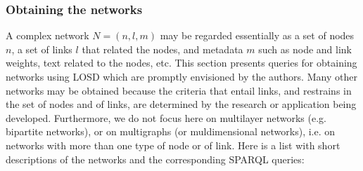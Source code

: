 \documentclass[data,datadescriptor,submit,moreauthors,pdftex]{Definitions/mdpi}
\begin{document}
\subsubsection{Obtaining the networks}\label{snet}
A complex network $N=(n,l,m)$ may be regarded essentially as
a set of nodes $n$, a set of links $l$ that related the nodes,
and metadata $m$ such as node and link weights, text related to the nodes, etc.
This section presents queries for obtaining networks using LOSD
which are promptly envisioned by the authors.
Many other networks may be obtained because the criteria that entail
links, and restrains in the set of nodes and of links,
are determined by the research or application being developed.
Furthermore, we do not focus here on multilayer networks (e.g. bipartite networks), or on multigraphs (or muldimensional networks), i.e. on networks with more than one type of node or of link.
Here is a list with short descriptions of the networks and the corresponding SPARQL queries:
\end{document}
